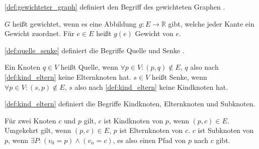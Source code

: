 \autoref{def:gewichteter_graph} definiert den Begriff des gewichteten Graphen
\autocite[vgl.][253]{AlgorithmenUndDatenstrukturen}.
\begin{definition}
    $G$ heißt gewichtet, wenn es eine Abbildung $g:E\rightarrow \mathbb{R}$
    gibt, welche jeder Kante ein Gewicht zuordnet. Für $e\in E$ heißt $g(e)$
    Gewicht von $e$.
    \label{def:gewichteter_graph}
\end{definition}

\autoref{def:quelle_senke} definiert die Begriffe Quelle und Senke
\autocite[vgl.][306]{AlgorithmenUndDatenstrukturen}.
\begin{definition}
    Ein Knoten $q \in V$ heißt Quelle, wenn $ \forall p \in V: (p,q) \not \in E
    $, $q$ also nach \autoref{def:kind_eltern} keine Elternknoten hat.
    $s \in V$ heißt Senke, wenn $ \forall p \in V: (s,p) \not \in E $, $s$ also
    nach \autoref{def:kind_eltern} keine Kindknoten hat.
    \label{def:quelle_senke}
\end{definition}

\autoref{def:kind_eltern} definiert die Begriffe Kindknoten, Elternknoten und
Subknoten.
\begin{definition}
    Für zwei Knoten $c$ und $p$ gilt, $c$ ist Kindknoten von $p$, wenn $(p,c)\in E$.
    Umgekehrt gilt, wenn $(p,c)\in E$, $p$ ist Elternknoten von $c$.
    $c$ ist Subknoten von $p$, wenn $\exists P: (v_0=p) \land (v_n=c)$, es also
    einen Pfad von $p$ nach $c$ gibt.
    \label{def:kind_eltern}
\end{definition}
